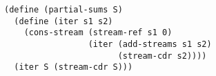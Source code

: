 \documentclass[a4paper,12pt]{article}
\begin{document}
\begin{lstlisting}
(define (partial-sums S)
  (define (iter s1 s2)
    (cons-stream (stream-ref s1 0)
                 (iter (add-streams s1 s2)
                       (stream-cdr s2))))
  (iter S (stream-cdr S)))
\end{lstlisting}
\end{document}
